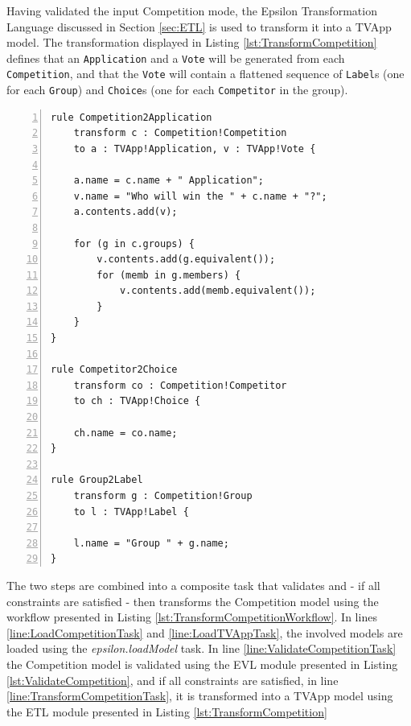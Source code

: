 Having validated the input Competition mode, the Epsilon Transformation Language discussed in Section \ref{sec:ETL} is used to transform it into a TVApp model. The transformation displayed in Listing \ref{lst:TransformCompetition} defines that an \texttt{Application} and a \texttt{Vote} will be generated from each \texttt{Competition}, and that the \texttt{Vote} will contain a flattened sequence of \texttt{Label}s (one for each \texttt{Group}) and \texttt{Choice}s (one for each \texttt{Competitor} in the group).

\begin{lstlisting}[basicstyle=\ttfamily\footnotesize, nolol=true, flexiblecolumns=true, numbers=left, caption=ETL transformation that transforms a Competition model into a TVApp model, tabsize=2, label=lst:TransformCompetition, language=ETL]
rule Competition2Application
	transform c : Competition!Competition
	to a : TVApp!Application, v : TVApp!Vote {

	a.name = c.name + " Application";
	v.name = "Who will win the " + c.name + "?";	
	a.contents.add(v);
	
	for (g in c.groups) {
		v.contents.add(g.equivalent());
		for (memb in g.members) {
			v.contents.add(memb.equivalent());
		}
	}
}

rule Competitor2Choice
	transform co : Competition!Competitor
	to ch : TVApp!Choice {

	ch.name = co.name;
}

rule Group2Label
	transform g : Competition!Group
	to l : TVApp!Label {
	
	l.name = "Group " + g.name;
}
\end{lstlisting}

The two steps are combined into a composite task that validates and - if all constraints are satisfied - then transforms the Competition model using the workflow presented in Listing \ref{lst:TransformCompetitionWorkflow}. In lines \ref{line:LoadCompetitionTask} and \ref{line:LoadTVAppTask}, the involved models are loaded using the \emph{epsilon.loadModel} task. In line \ref{line:ValidateCompetitionTask} the Competition model is validated using the EVL module presented in Listing \ref{lst:ValidateCompetition}, and if all constraints are satisfied, in line \ref{line:TransformCompetitionTask}, it is transformed into a TVApp model using the ETL module presented in Listing \ref{lst:TransformCompetition}

